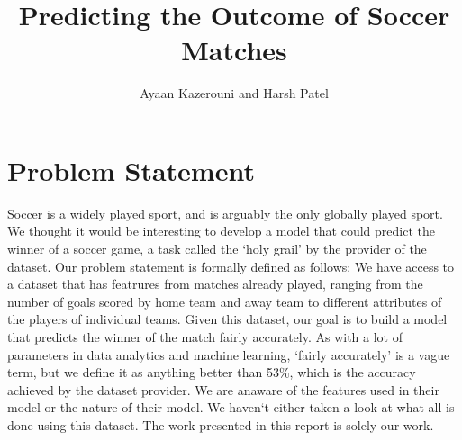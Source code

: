 \documentclass[11pt]{article}
\begin{document}
\title{Predicting the Outcome of Soccer Matches}
\author{Ayaan Kazerouni and Harsh Patel}
\date{}
\maketitle

\section{Problem Statement}
Soccer is a widely played sport, and is arguably the only globally played sport.
We thought it would be interesting to develop a model that could predict the winner of a soccer game, a task called the `holy grail' by the provider of the dataset. Our problem statement is formally defined as follows:
\newline
\newline
We have access to a dataset that has featrures from matches already played, ranging from the number of goals scored by home team and away team to different attributes of the players of individual teams. Given this dataset, our goal is to build a model that predicts the winner of the match fairly accurately. As with a lot of parameters in data analytics and machine learning, `fairly accurately' is a vague term, but we define it as anything better than 53\%, which is the accuracy achieved by the dataset provider. We are anaware of the features used in their model or the nature of their model. We haven`t either taken a look at what all is done using this dataset. The work presented in this report is solely our work.
\end{document}
